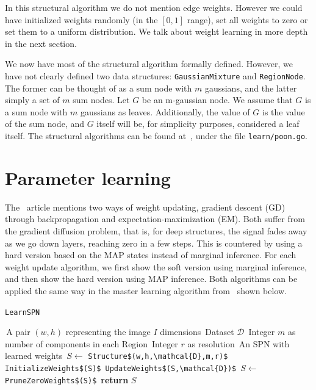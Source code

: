 \documentclass{amsart}
\theoremstyle{plain}
\numberwithin{equation}{section}
\newcommand{\code}[1]{\lstinline[mathescape=true]{#1}}
\newcommand{\mcode}[1]{\lstinline[mathescape]!#1!}
\begin{document}
In this structural algorithm we do not mention edge weights. However we could have initialized
weights randomly (in the $[0,1]$ range), set all weights to zero or set them to a uniform
distribution. We talk about weight learning in more depth in the next section.

We now have most of the structural algorithm formally defined. However, we have not clearly defined
two data structures: \code{GaussianMixture} and \code{RegionNode}. The former can be thought of as
a sum node with $m$ gaussians, and the latter simply a set of $m$ sum nodes. Let $G$ be an
m-gaussian node. We assume that $G$ is a sum node with $m$ gaussians as leaves. Additionally, the
value of $G$ is the value of the sum node, and $G$ itself will be, for simplicity purposes,
considered a leaf itself. The structural algorithms can be found at~\cite{gospn}, under the file
\code{learn/poon.go}.

\section{Parameter learning}

The~\cite{poon-domingos} article mentions two ways of weight updating, gradient descent (GD)
through backpropagation and expectation-maximization (EM). Both suffer from the gradient diffusion
problem, that is, for deep structures, the signal fades away as we go down layers, reaching zero in
a few steps.  This is countered by using a hard version based on the MAP states instead of marginal
inference. For each weight update algorithm, we first show the soft version using marginal
inference, and then show the hard version using MAP inference. Both algorithms can be applied the
same way in the master learning algorithm from~\cite{poon-domingos} shown below.

\begin{algorithm}[h]
  \caption{\code{LearnSPN}}\label{alg:learnspn}
  \begin{algorithmic}[1]
    \Require\,A pair $(w,h)$ representing the image $I$ dimensions
    \Require\,Dataset $\mathcal{D}$
    \Require\,Integer $m$ as number of components in each Region
    \Require\,Integer $r$ as resolution
    \Ensure\,An SPN with learned weights
    \State\,$S\gets$ \mcode{Structure$(w,h,\mathcal{D},m,r)$}
    \State\,\mcode{InitializeWeights$(S)$}
    \Repeat%
      \State\,\mcode{UpdateWeights$(S,\mathcal{D})$}
    \State\,$S\gets$ \mcode{PruneZeroWeights$(S)$}
    \State\,\textbf{return} $S$
  \end{algorithmic}
\end{algorithm}
\end{document}
